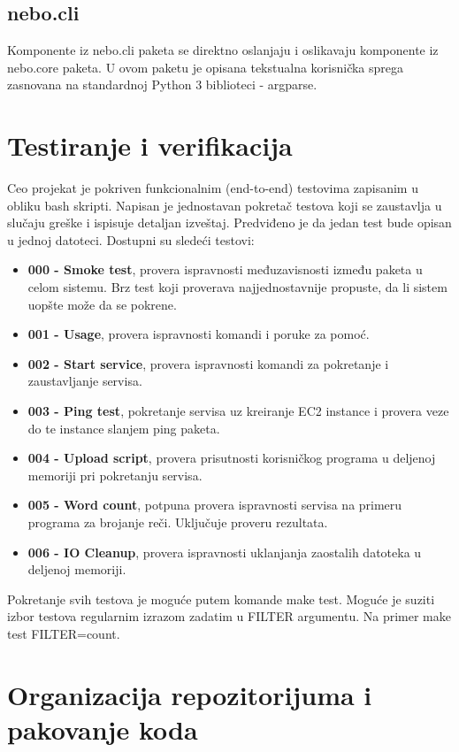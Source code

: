 \documentclass[a4paper]{article}
\begin{document}
\subsection{nebo.cli}

Komponente iz nebo.cli paketa se direktno oslanjaju i oslikavaju komponente iz
nebo.core paketa. U ovom paketu je opisana tekstualna korisnička sprega
zasnovana na standardnoj Python 3 biblioteci - argparse.

\section{Testiranje i verifikacija}

Ceo projekat je pokriven funkcionalnim (end-to-end) testovima zapisanim u
obliku bash skripti. Napisan je jednostavan pokretač testova koji se zaustavlja
u slučaju greške i ispisuje detaljan izveštaj. Predviđeno je da jedan test bude
opisan u jednoj datoteci. Dostupni su sledeći testovi:

\begin{itemize}
\item {\bf 000 - Smoke test}, provera ispravnosti međuzavisnosti između paketa u
  celom sistemu. Brz test koji proverava najjednostavnije propuste, da li sistem uopšte
  može da se pokrene.
  \item {\bf 001 - Usage}, provera ispravnosti komandi i poruke za pomoć.
  \item {\bf 002 - Start service}, provera ispravnosti komandi za pokretanje i
    zaustavljanje servisa.
  \item {\bf 003 - Ping test}, pokretanje servisa uz kreiranje EC2 instance i
    provera veze do te instance slanjem ping paketa.
  \item {\bf 004 - Upload script}, provera prisutnosti korisničkog programa u
    deljenoj memoriji pri pokretanju servisa.
  \item {\bf 005 - Word count}, potpuna provera ispravnosti servisa na primeru
    programa za brojanje reči. Uključuje proveru rezultata.
  \item {\bf 006 - IO Cleanup}, provera ispravnosti uklanjanja zaostalih
    datoteka u deljenoj memoriji.
\end{itemize}

Pokretanje svih testova je moguće putem komande make test. Moguće je suziti
izbor testova regularnim izrazom zadatim u FILTER argumentu. Na primer make test FILTER=count.

\section{Organizacija repozitorijuma i pakovanje koda}
\end{document}
